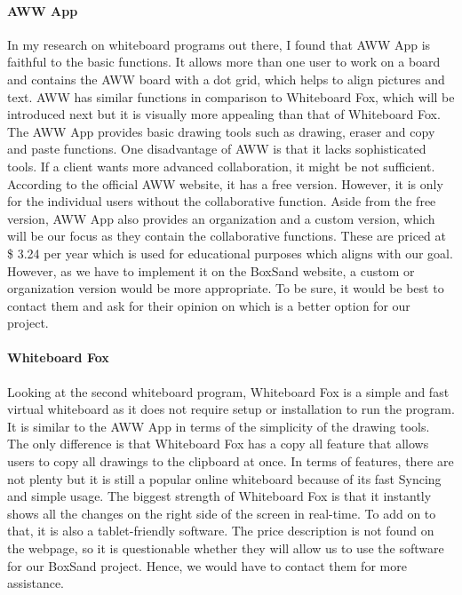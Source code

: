 \documentclass[10pt]{article}
\begin{document}
            \paragraph{AWW App}
                In my research on whiteboard programs out there, I found that AWW App is faithful to the basic functions. It allows more than one user to work on a board and contains the AWW board with a dot grid, which helps to align pictures and text. AWW has similar functions in comparison to Whiteboard Fox, which will be introduced next but it is visually more appealing than that of Whiteboard Fox. The AWW App provides basic drawing tools such as drawing, eraser and copy and paste functions. One disadvantage of AWW is that it lacks sophisticated tools. If a client wants more advanced collaboration, it might be not sufficient. According to the official AWW website, it has a free version. However, it is only for the individual users without the collaborative function. Aside from the free version, AWW App also provides an organization and a custom version, which will be our focus as they contain the collaborative functions. These are priced at \$ 3.24 per year which is used for educational purposes which aligns with our goal. However, as we have to implement it on the BoxSand website, a custom or organization version would be more appropriate. To be sure, it would be best to contact them and ask for their opinion on which is a better option for our project. \cite{AWW APP Price}

            \paragraph{Whiteboard Fox}
                Looking at the second whiteboard program, Whiteboard Fox is a simple and fast virtual whiteboard as it does not require setup or installation to run the program. It is similar to the AWW App in terms of the simplicity of the drawing tools. The only difference is that Whiteboard Fox has a copy all feature that allows users to copy all drawings to the clipboard at once. In terms of features, there are not plenty but it is still a popular online whiteboard because of its fast Syncing and simple usage. The biggest strength of Whiteboard Fox is that it instantly shows all the changes on the right side of the screen in real-time. To add on to that, it is also a tablet-friendly software. The price description is not found on the webpage, so it is questionable whether they will allow us to use the software for our BoxSand project. Hence, we would have to contact them for more assistance.
\end{document}
